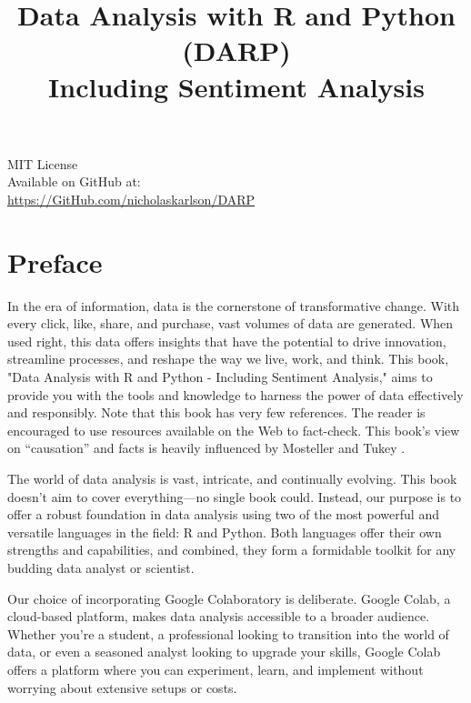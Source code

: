 \documentclass{book}
\begin{document}
\title{Data Analysis with R and Python (DARP) \\ \large Including Sentiment Analysis}
\author{}
\date{}
\maketitle

\begin{center}
    MIT License \\
    Available on GitHub at: \\
    \url{https://GitHub.com/nicholaskarlson/DARP}
\end{center}

\tableofcontents

\chapter*{Preface}
In the era of information, data is the cornerstone of transformative change. With every click, like, share, and purchase, vast volumes of data are generated. When used right, this data offers insights that have the potential to drive innovation, streamline processes, and reshape the way we live, work, and think. This book, "Data Analysis with R and Python - Including Sentiment Analysis," aims to provide you with the tools and knowledge to harness the power of data effectively and responsibly. Note that this book has very few references. The reader is encouraged to use resources available on the Web to fact-check. This book's view on ``causation'' and facts is heavily influenced by Mosteller and Tukey \parencite{mosteller1977}.

The world of data analysis is vast, intricate, and continually evolving. This book doesn't aim to cover everything—no single book could. Instead, our purpose is to offer a robust foundation in data analysis using two of the most powerful and versatile languages in the field: R and Python. Both languages offer their own strengths and capabilities, and combined, they form a formidable toolkit for any budding data analyst or scientist.

Our choice of incorporating Google Colaboratory is deliberate. Google Colab, a cloud-based platform, makes data analysis accessible to a broader audience. Whether you're a student, a professional looking to transition into the world of data, or even a seasoned analyst looking to upgrade your skills, Google Colab offers a platform where you can experiment, learn, and implement without worrying about extensive setups or costs.
\end{document}
